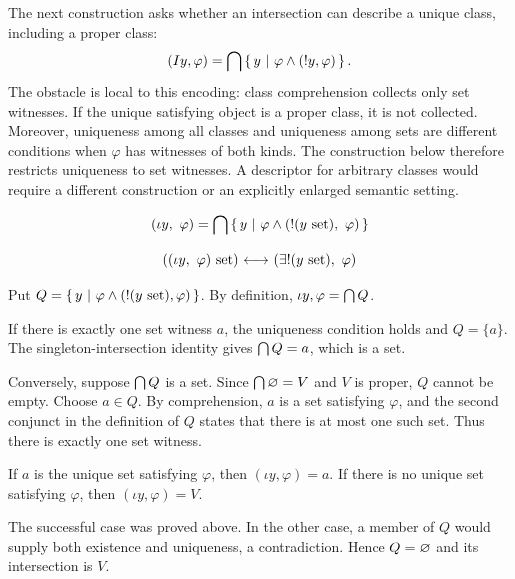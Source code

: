 The next construction asks whether an intersection can describe a unique
class, including a proper class:
\[
(I y,\varphi)=\bigcap\left\{\,y\ \middle|\ \varphi\land(!y,\varphi)\,\right\}.
\]
The obstacle is local to this encoding: class comprehension collects only
set witnesses. If the unique satisfying object is a proper class, it is not
collected. Moreover, uniqueness among all classes and uniqueness among sets
are different conditions when $\varphi$ has witnesses of both kinds.
The construction below therefore restricts uniqueness to set witnesses.
A descriptor for arbitrary classes would require a different construction
or an explicitly enlarged semantic setting.
\begin{definition}
\[
(\iota y,\  \varphi) = \bigcap \left\{\,y\ \middle|\ \varphi \land (!(y\mathrm{\ set}),\ \varphi)\,\right\}
\]
\label{def:iota operator}
\end{definition}

\begin{theorem}

\[
((\iota y,\  \varphi) \mathrm{\ set})
{\ \longleftrightarrow\ }
(\exists!(y\mathrm{\ set}),\ \varphi)
\]
\label{thm:iota set exists unique set}
\end{theorem}
\Proof
Put $Q=\left\{\,y\ \middle|\ \varphi\land(!(y\mathrm{\ set}),\varphi)\,\right\}$. By definition,
$\iota y,\varphi=\bigcap Q$.

If there is exactly one set witness $a$, the uniqueness condition holds and
$Q=\{a\}$. The singleton-intersection identity gives
$\bigcap Q=a$, which is a set.

Conversely, suppose $\bigcap Q$ is a set. Since
$\bigcap\varnothing=V$ and $V$ is proper, $Q$ cannot be empty.
Choose $a\in Q$. By comprehension, $a$ is a set satisfying $\varphi$, and
the second conjunct in the definition of $Q$ states that there is at most
one such set. Thus there is exactly one set witness.
\Done

\begin{corollary}
If $a$ is the unique set satisfying $\varphi$, then
$(\iota y,\varphi)=a$. If there is no unique set satisfying $\varphi$,
then $(\iota y,\varphi)=V$.
\end{corollary}
\Proof
The successful case was proved above. In the other case, a member of $Q$
would supply both existence and uniqueness, a contradiction. Hence
$Q=\varnothing$ and its intersection is $V$.
\Done

